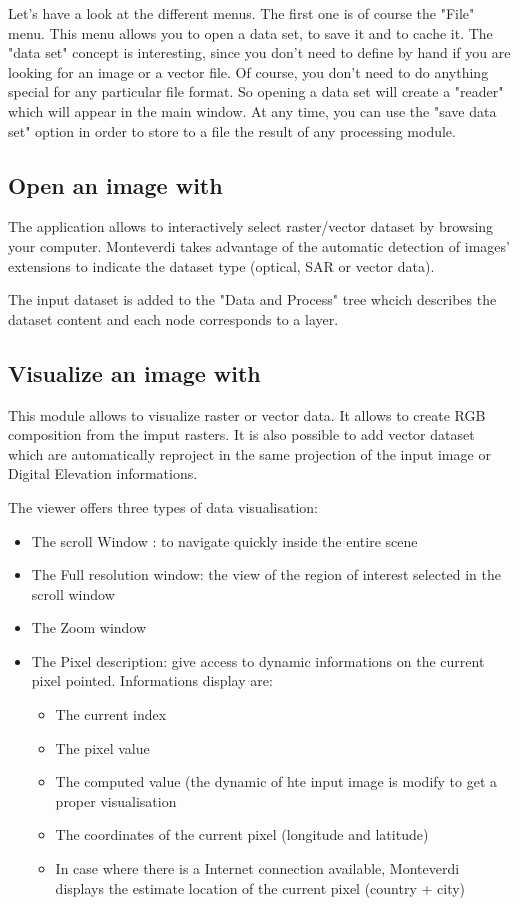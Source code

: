 Let's have a look at the different menus. The first one is of course
the "File" menu. This menu allows you to open a data set, to save it
and to cache it. The "data set" concept is interesting, since you
don't need to define by hand if you are looking for an image or a
vector file. Of course, you don't need to do anything special for any
particular file format. So opening a data set will create a "reader"
which will appear in the main window. At any time, you can use the
"save data set" option in order to store to a file the result of any
processing module.


\subsection{Open an image with \mont}
The application allows to interactively select raster/vector dataset
by browsing your computer. Monteverdi takes advantage of the automatic
detection of images' extensions to indicate the dataset type (optical,
SAR or vector data).

The input dataset is added to the "Data and Process" tree whcich
describes the dataset content and each node corresponds to a layer.

\subsection{Visualize an image with \mont}
This module allows to visualize raster or vector data. It allows to
create RGB composition from the imput rasters. It is also possible to
add vector dataset which are automatically reproject in the same
projection of the input image or Digital Elevation informations.

The viewer offers three types of data visualisation: 

\begin{itemize}
\item The scroll Window : to navigate quickly inside the entire scene
\item The Full resolution window: the view of the region of interest
  selected in the scroll window
\item The Zoom window
\item The Pixel description: give access to dynamic informations on
  the current pixel pointed. Informations display are:
  \begin{itemize}
  \item The current index
  \item The pixel value 
  \item The computed value (the dynamic of hte input image is modify
    to get a proper visualisation
  \item The coordinates of the current pixel (longitude and latitude)
  \item In case where there is a Internet connection available,
    Monteverdi displays the estimate location of the current pixel
    (country + city)
  \end{itemize} 
\end{itemize}

